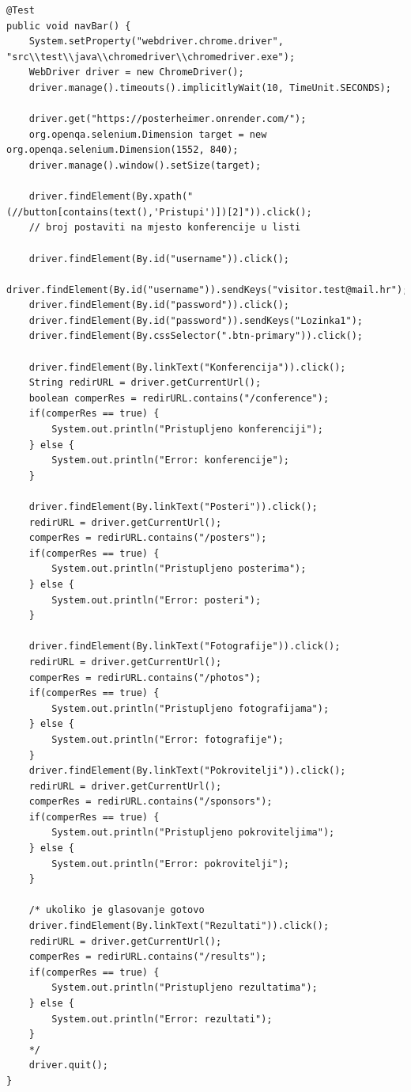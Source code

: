 	\begin{lstlisting}
@Test
public void navBar() {
	System.setProperty("webdriver.chrome.driver", "src\\test\\java\\chromedriver\\chromedriver.exe");
	WebDriver driver = new ChromeDriver();
	driver.manage().timeouts().implicitlyWait(10, TimeUnit.SECONDS);	
	
	driver.get("https://posterheimer.onrender.com/");
	org.openqa.selenium.Dimension target = new  org.openqa.selenium.Dimension(1552, 840);
	driver.manage().window().setSize(target);
	
	driver.findElement(By.xpath("(//button[contains(text(),'Pristupi')])[2]")).click();
	// broj postaviti na mjesto konferencije u listi
	
	driver.findElement(By.id("username")).click();
	driver.findElement(By.id("username")).sendKeys("visitor.test@mail.hr");
	driver.findElement(By.id("password")).click();
	driver.findElement(By.id("password")).sendKeys("Lozinka1");
	driver.findElement(By.cssSelector(".btn-primary")).click();
	
	driver.findElement(By.linkText("Konferencija")).click();
	String redirURL = driver.getCurrentUrl();
	boolean comperRes = redirURL.contains("/conference");
	if(comperRes == true) {
		System.out.println("Pristupljeno konferenciji");
	} else {
		System.out.println("Error: konferencije");
	}
	
	driver.findElement(By.linkText("Posteri")).click();
	redirURL = driver.getCurrentUrl();
	comperRes = redirURL.contains("/posters");
	if(comperRes == true) {
		System.out.println("Pristupljeno posterima");
	} else {
		System.out.println("Error: posteri");
	}
	
	driver.findElement(By.linkText("Fotografije")).click();
	redirURL = driver.getCurrentUrl();
	comperRes = redirURL.contains("/photos");
	if(comperRes == true) {
		System.out.println("Pristupljeno fotografijama");
	} else {
		System.out.println("Error: fotografije");
	}
	driver.findElement(By.linkText("Pokrovitelji")).click();
	redirURL = driver.getCurrentUrl();
	comperRes = redirURL.contains("/sponsors");
	if(comperRes == true) {
		System.out.println("Pristupljeno pokroviteljima");
	} else {
		System.out.println("Error: pokrovitelji");
	}
	
	/* ukoliko je glasovanje gotovo
	driver.findElement(By.linkText("Rezultati")).click();
	redirURL = driver.getCurrentUrl();
	comperRes = redirURL.contains("/results");
	if(comperRes == true) {
		System.out.println("Pristupljeno rezultatima");
	} else {
		System.out.println("Error: rezultati");
	}
	*/
	driver.quit();
}
	\end{lstlisting}
	
